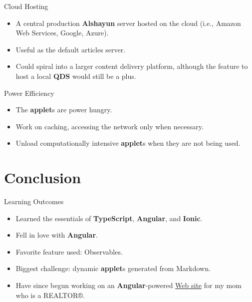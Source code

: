 \documentclass{beamer}
\begin{document}
\begin{frame}{Cloud Hosting}
    \begin{itemize}
        \item A central production \textbf{Alshayun} server hosted on the cloud
            (i.e., Amazon Web Services, Google, Azure).
        \item Useful as the default articles server.
        \item Could spiral into a larger content delivery platform, although the
            feature to host a local \textbf{QDS} would still be a plus.
    \end{itemize}
\end{frame}

\begin{frame}{Power Efficiency}
    \begin{itemize}
        \item The \textbf{applet}s are power hungry.
        \item Work on caching, accessing the network only when necessary.
        \item Unload computationally intensive \textbf{applet}s when they are
            not being used.
    \end{itemize}
\end{frame}

\section{Conclusion}

\begin{frame}{Learning Outcomes}
    \begin{itemize}
        \item Learned the essentials of \textbf{TypeScript}, \textbf{Angular},
            and \textbf{Ionic}.
        \item Fell in love with \textbf{Angular}.
        \item Favorite feature used: Observables.
        \item Biggest challenge: dynamic \textbf{applet}s generated from
            Markdown.
        \item Have since begun working on an \textbf{Angular}-powered
            \href{https://kristinickells.com}{Web site} for my mom who is a
            REALTOR®.
    \end{itemize}
\end{frame}
\end{document}
